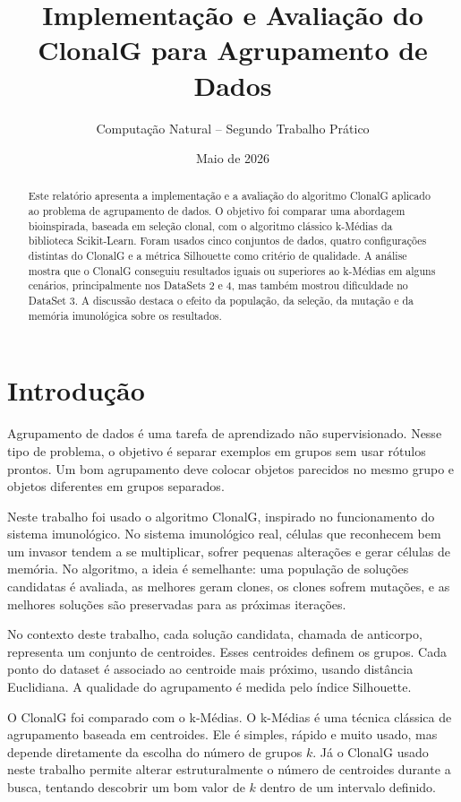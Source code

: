 \documentclass[12pt,a4paper]{article}
\title{Implementação e Avaliação do ClonalG para Agrupamento de Dados}
\author{Computação Natural -- Segundo Trabalho Prático}
\date{Maio de 2026}
\begin{document}
\maketitle

\begin{abstract}
Este relatório apresenta a implementação e a avaliação do algoritmo ClonalG aplicado ao problema de agrupamento de dados. O objetivo foi comparar uma abordagem bioinspirada, baseada em seleção clonal, com o algoritmo clássico k-Médias da biblioteca Scikit-Learn. Foram usados cinco conjuntos de dados, quatro configurações distintas do ClonalG e a métrica Silhouette como critério de qualidade. A análise mostra que o ClonalG conseguiu resultados iguais ou superiores ao k-Médias em alguns cenários, principalmente nos DataSets 2 e 4, mas também mostrou dificuldade no DataSet 3. A discussão destaca o efeito da população, da seleção, da mutação e da memória imunológica sobre os resultados.
\end{abstract}

\tableofcontents
\newpage

\section{Introdução}

Agrupamento de dados é uma tarefa de aprendizado não supervisionado. Nesse tipo de problema, o objetivo é separar exemplos em grupos sem usar rótulos prontos. Um bom agrupamento deve colocar objetos parecidos no mesmo grupo e objetos diferentes em grupos separados.

Neste trabalho foi usado o algoritmo ClonalG, inspirado no funcionamento do sistema imunológico. No sistema imunológico real, células que reconhecem bem um invasor tendem a se multiplicar, sofrer pequenas alterações e gerar células de memória. No algoritmo, a ideia é semelhante: uma população de soluções candidatas é avaliada, as melhores geram clones, os clones sofrem mutações, e as melhores soluções são preservadas para as próximas iterações.

No contexto deste trabalho, cada solução candidata, chamada de anticorpo, representa um conjunto de centroides. Esses centroides definem os grupos. Cada ponto do dataset é associado ao centroide mais próximo, usando distância Euclidiana. A qualidade do agrupamento é medida pelo índice Silhouette.

O ClonalG foi comparado com o k-Médias. O k-Médias é uma técnica clássica de agrupamento baseada em centroides. Ele é simples, rápido e muito usado, mas depende diretamente da escolha do número de grupos \(k\). Já o ClonalG usado neste trabalho permite alterar estruturalmente o número de centroides durante a busca, tentando descobrir um bom valor de \(k\) dentro de um intervalo definido.
\end{document}

